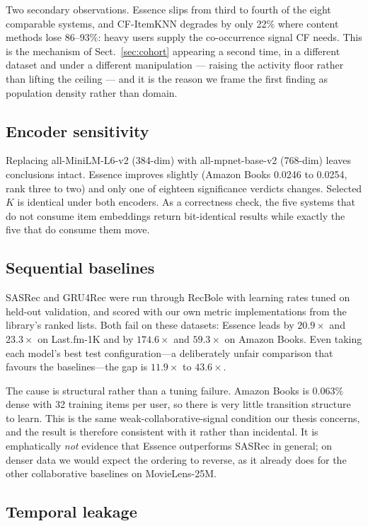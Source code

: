 \documentclass[runningheads]{llncs}
\begin{document}
Two secondary observations. Essence slips from third to fourth of the eight comparable
systems, and CF-ItemKNN degrades by only 22\% where content methods lose 86--93\%: heavy
users supply the co-occurrence signal CF needs. This is the mechanism of
Sect.~\ref{sec:cohort} appearing a second time, in a different dataset and under a
different manipulation --- raising the activity floor rather than lifting the ceiling ---
and it is the reason we frame the first finding as population density rather than domain.

\subsection{Encoder sensitivity}

Replacing all-MiniLM-L6-v2 (384-dim) with all-mpnet-base-v2 (768-dim) leaves conclusions
intact. Essence improves slightly (Amazon Books 0.0246 to 0.0254, rank three to two) and
only one of eighteen significance verdicts changes. Selected $K$ is identical under both
encoders. As a correctness check, the five systems that do not consume item
embeddings return bit-identical results while exactly the five that do consume them move.

\subsection{Sequential baselines}\label{sec:seq}

SASRec and GRU4Rec were run through RecBole with learning rates tuned on held-out
validation, and scored with our own metric implementations from the library's ranked lists.
Both fail on these datasets: Essence leads by $20.9\times$ and $23.3\times$ on Last.fm-1K
and by $174.6\times$ and $59.3\times$ on Amazon Books. Even taking each model's
best test configuration---a deliberately unfair comparison that favours the
baselines---the gap is $11.9\times$ to $43.6\times$.

The cause is structural rather than a tuning failure. Amazon Books is 0.063\% dense with 32
training items per user, so there is very little transition structure to learn. This is the
same weak-collaborative-signal condition our thesis concerns, and the result is therefore
consistent with it rather than incidental. It is emphatically \emph{not} evidence that
Essence outperforms SASRec in general; on denser data we would expect the ordering to
reverse, as it already does for the other collaborative baselines on MovieLens-25M.

\subsection{Temporal leakage}\label{sec:leak}
\end{document}
